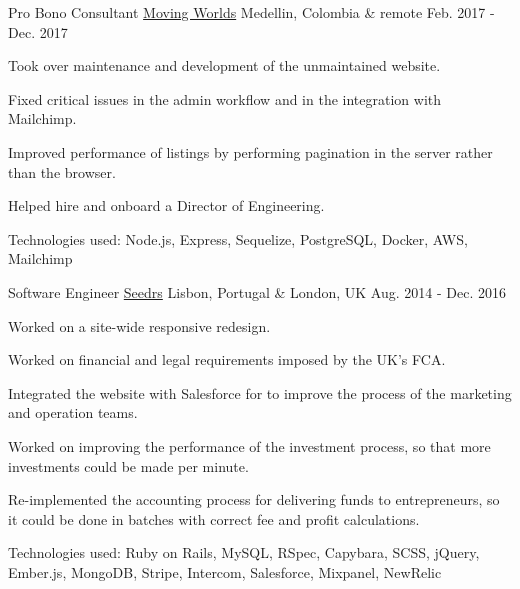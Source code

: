 \documentclass[11pt, a4paper]{awesome-cv}
\begin{document}
\begin{cventries}
  \cventry
    {Pro Bono Consultant} %
    {\href{https://movingworlds.org/}{Moving Worlds}} %
    {Medellin, Colombia \& remote} %
    {Feb. 2017 - Dec. 2017} %
    {
      \begin{cvitems} %
        \item {Took over maintenance and development of the unmaintained website.}
        \item {Fixed critical issues in the admin workflow and in the integration with Mailchimp.}
        \item {Improved performance of listings by performing pagination in the server rather than the browser.}
        \item {Helped hire and onboard a Director of Engineering.}
        \item {Technologies used: Node.js, Express, Sequelize, PostgreSQL, Docker, AWS, Mailchimp}
      \end{cvitems}
    }

  \cventry
    {Software Engineer} %
    {\href{https://www.seedrs.com/}{Seedrs}} %
    {Lisbon, Portugal \& London, UK} %
    {Aug. 2014 - Dec. 2016} %
    {
      \begin{cvitems} %
        \item {Worked on a site-wide responsive redesign.}
        \item {Worked on financial and legal requirements imposed by the UK’s FCA.}
        \item {Integrated the website with Salesforce for to improve the process of the marketing and operation teams.}
        \item {Worked on improving the performance of the investment process, so that more investments could be made per minute.}
        \item {Re-implemented the accounting process for delivering funds to entrepreneurs, so it could be done in batches with correct fee and profit calculations.}
        \item {Technologies used: Ruby on Rails, MySQL, RSpec, Capybara, SCSS, jQuery, Ember.js, MongoDB, Stripe, Intercom, Salesforce, Mixpanel, NewRelic}
      \end{cvitems}
    }

\end{cventries}
\end{document}
